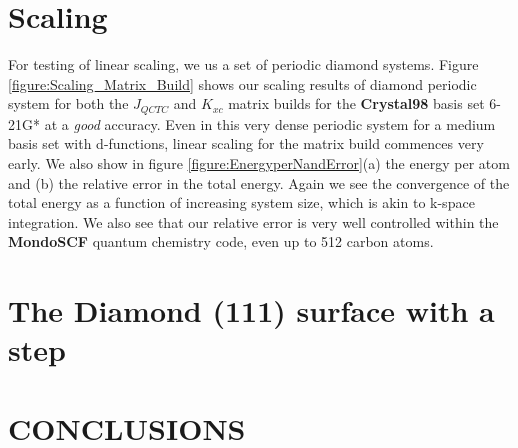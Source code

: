 \documentclass[prb,aps,nobibnotes,twocolumn,doublespace,twocolumngrid,superbib]{revtex4}
\begin{document}
\section{Scaling}

For testing of linear scaling, we us a set of periodic diamond systems.
Figure \ref{figure:Scaling_Matrix_Build} shows our scaling results
of diamond periodic system for both the \( J_{QCTC} \) and \( K_{xc} \)
matrix builds for the \textbf{Crystal98} basis set 6-21G* \cite{C98Basis}
at a {\it good} accuracy. Even in this very dense periodic system for a medium 
basis set with d-functions, linear scaling for the matrix build commences very 
early. We also show in figure \ref{figure:EnergyperNandError}(a) the energy per atom and 
(b) the relative error in the total energy. Again we see the convergence of the total energy
as a function of increasing system size, which is akin to k-space integration. We also
see that our relative error is very well controlled within the \textbf{MondoSCF} quantum
chemistry code, even up to 512 carbon atoms.

\section{The Diamond (111) surface with a step}




\section{CONCLUSIONS}
\end{document}
